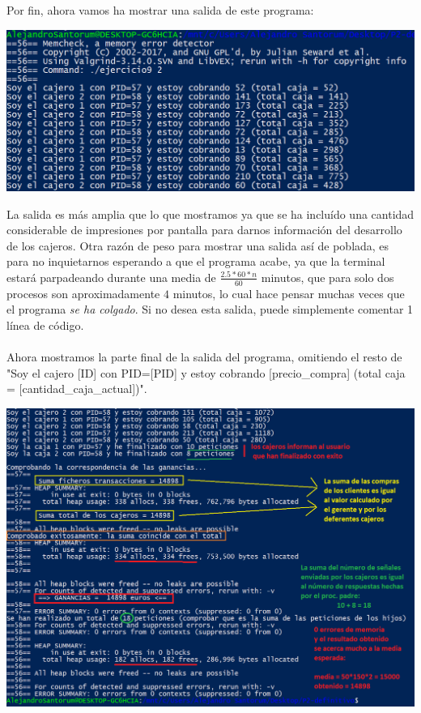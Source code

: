 \documentclass[12pt]{article}
\begin{document}
Por fin, ahora vamos ha mostrar una salida de este programa:
\begin{center}
	\includegraphics[scale=1]{ej9_1.PNG}
\end{center}
La salida es más amplia que lo que mostramos ya que se ha incluído una cantidad considerable de impresiones por pantalla para darnos información del desarrollo de los cajeros. Otra razón de peso para mostrar una salida así de poblada, es para no inquietarnos esperando a que el programa acabe, ya que la terminal estará parpadeando durante una media de $\frac{2.5*60*n}{60}$ minutos, que para solo dos procesos son aproximadamente $4$ minutos, lo cual hace pensar muchas veces que el programa \emph{se ha colgado}. Si no desea esta salida, puede simplemente comentar 1 línea de código.\\\\
\newpage
Ahora mostramos la parte final de la salida del programa, omitiendo el resto de "Soy el cajero [ID] con PID=[PID] y estoy cobrando [precio\_compra] (total caja = [cantidad\_caja\_actual])".
\begin{center}
	\includegraphics[scale=1]{ej9_2.PNG}
\end{center}
\end{document}
